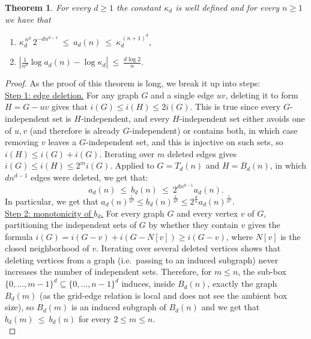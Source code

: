 \documentclass{article}
\theoremstyle{plain}
\newtheorem{theorem}{Theorem}[section]
\theoremstyle{definition}
\theoremstyle{remark}
\begin{document}
\begin{theorem}\label{thm:existence}
For every $d\ge1$ the constant $\kappa_d$ is well defined and for every $n\ge1$ we have that 

\begin{enumerate}
    \item $\kappa_d^{\,n^d}\,2^{-dn^{d-1}}\ \le\ a_d(n)\ \le\ \kappa_d^{\,(n+1)^d}$, 
    \item $
\left|\frac1{n^d}\log a_d(n)-\log\kappa_d\right|\ \le\ \frac{d\log2}n.$
\end{enumerate}
\end{theorem}
\begin{proof}
As the proof of this theorem is long, we break it up into steps:\\

\underline{Step 1: edge deletion.} For any graph $G$ and a single edge $uv$, deleting it to form $H=G-uv$ gives that $i(G)\le i(H)\le2i(G)$. This is true since every $G$-independent set is $H$-independent, and every $H$-independent set either avoids one of $u,v$ (and therefore is already $G$-independent) or contains both, in which case removing $v$ leaves a $G$-independent set, and this is injective on such sets, so $i(H)\le i(G)+i(G)$. Iterating over $m$ deleted edges gives $i(G)\le i(H)\le2^mi(G)$. Applied to $G =T_d(n)$ and $H=B_d(n)$, in which $dn^{d-1}$ edges were deleted, we get that:
\begin{equation*}\label{eq:torusgridcompare}
a_d(n)\ \le\ b_d(n)\ \le\ 2^{dn^{d-1}}a_d(n).
\end{equation*}
In particular, we get that $a_d(n)^{\frac{1}{n^d}} \leq b_d(n)^{\frac{1}{n^d}} \leq 2^{\frac{d}{n}}a_d(n)^{\frac{1}{n^d}}$.\\

\underline{Step 2: monotonicity of $b_d$.} For every graph $G$ and every vertex $v$ of $G$, partitioning the independent sets of $G$ by whether they contain $v$ gives the formula $i(G)=i(G-v)+i(G-N[v])\ge i(G-v)$, where $N[v]$ is the closed neighborhood of $v$. Iterating over several deleted vertices shows that deleting vertices from a graph (i.e.\ passing to an induced subgraph) never increases the number of independent sets. Therefore, for $m\le n$, the sub-box $\{0,\dots,m-1\}^d\subseteq\{0,\dots,n-1\}^d$ induces, inside $B_d(n)$, exactly the graph $B_d(m)$ (as the grid-edge relation is local and does not see the ambient box size), so $B_d(m)$ is an induced subgraph of $B_d(n)$ and we get that $b_d(m)\ \le\ b_d(n)$ for every $2 \leq m \leq n$. \\


\end{proof}
\end{document}
